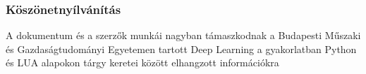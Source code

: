 \subsubsection*{Köszönetnyílvánítás}

A dokumentum és a szerzők munkái nagyban támaszkodnak a Budapesti Műszaki és Gazdaságtudományi Egyetemen tartott Deep Learning a gyakorlatban Python és LUA alapokon tárgy keretei között elhangzott információkra